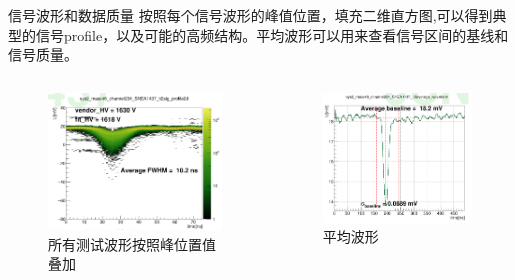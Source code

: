 \documentclass[11pt,compress,xcolor=x11names,UTF8]{beamer}
\begin{document}
\begin{frame}{信号波形和数据质量}
按照每个信号波形的峰值位置，填充二维直方图,可以得到典型的信号profile，以及可能的高频结构。平均波形可以用来查看信号区间的基线和信号质量。
\vspace{-.6cm}
\begin{columns}
\begin{column}{.5\textwidth}
\begin{figure}
\centering
\includegraphics[width=\textwidth]{figures/wavealign.png} %
\caption{所有测试波形按照峰位置值叠加}
\end{figure}
\end{column}
\begin{column}{.5\textwidth}
\begin{figure}
\centering
\includegraphics[width=\textwidth]{figures/avewave.png} %
\caption{平均波形}
\end{figure}
\end{column}
\end{columns}
\end{frame}
\end{document}

